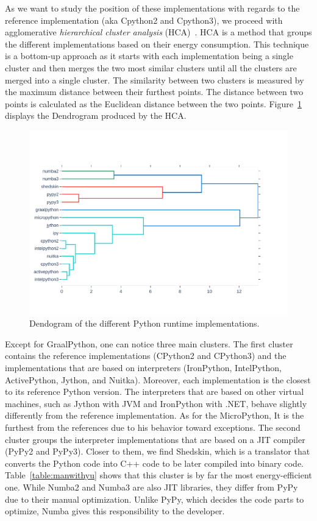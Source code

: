As we want to study the position of these implementations with regards to the reference implementation (aka Cpython2 and Cpython3), we proceed with agglomerative \emph{hierarchical cluster analysis} (HCA)~\cite{johnson1967hierarchical}.
HCA is a method that groups the different implementations based on their energy consumption.
This technique is a bottom-up approach as it starts with each implementation being a single cluster and then merges the two most similar clusters until all the clusters are merged into a single cluster.
The similarity between two clusters is measured by the maximum distance between their furthest points.
The distance between two points is calculated as the Euclidean distance between the two points.
Figure~\ref{fig:dendogram} displays the Dendrogram produced by the HCA.

\begin{figure}[!htb]
      \centering
      \includegraphics[width=.8\linewidth]{imgs/dendogram_interpreters}
      \caption{Dendogram of the different Python runtime implementations.}
      \label{fig:dendogram}
\end{figure}

Except for GraalPython, one can notice three main clusters.
The first cluster contains the reference implementations (CPython2 and CPython3) and the implementations that are based on interpreters (IronPython, IntelPython, ActivePython, Jython, and Nuitka).
Moreover, each implementation is the closest to its reference Python version.
The interpreters that are based on other virtual machines, such as Jython with JVM and IronPython with .NET, behave slightly differently from the reference implementation.
As for the MicroPython, It is the furthest from the references due to his behavior toward exceptions.
The second cluster groups the interpreter implementations that are based on a JIT compiler (PyPy2 and PyPy3).
Closer to them, we find Shedskin, which is a translator that converts the Python code into C++ code to be later compiled into binary code.
Table~\ref{table:manwithyu} shows that this cluster is by far the most energy-efficient one.
While Numba2 and Numba3 are also JIT libraries, they differ from PyPy due to their manual optimization.
Unlike PyPy, which decides the code parts to optimize, Numba gives this responsibility to the developer.
\bigskip

